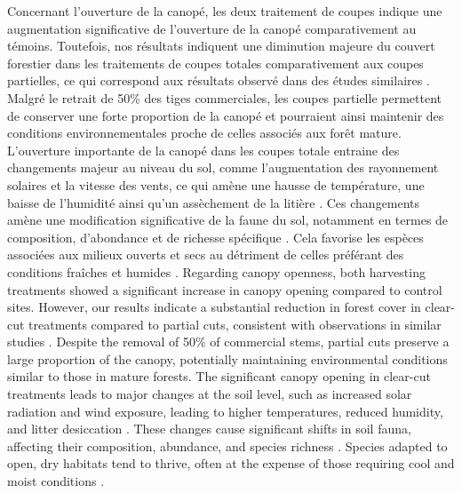
Concernant l'ouverture de la canopé, les deux traitement de coupes indique une augmentation significative de l'ouverture de la canopé comparativement au témoins. 
Toutefois, nos résultats indiquent une diminution majeure du couvert forestier dans les traitements de coupes totales comparativement aux coupes partielles, ce qui correspond aux résultats observé dans des études similaires \citep{Nolet2018Comparingeffects,Mazerolle2021Woodlandsalamander}. 
Malgré le retrait de 50\% des tiges commerciales, les coupes partielle permettent de conserver une forte proportion de la canopé et pourraient ainsi maintenir des conditions environnementales proche de celles associés aux forêt mature. 
L'ouverture importante de la canopé dans les coupes totale entraine des changements majeur au niveau du sol, comme l'augmentation des rayonnement solaires et la vitesse des vents, ce qui amène une hausse de température, une baisse de l'humidité ainsi qu'un assèchement de la litière \citep{Keenan1993ecologicaleffects,Chen1999MicroclimateForest,Lindo2003Microbialbiomass,Brooks2008Forestfloor}. 
Ces changements amène une modification significative de la faune du sol, notamment en termes de composition, d'abondance et de richesse spécifique \citep{Staab2023Insectdecline}. 
Cela favorise les espèces associées aux milieux ouverts et secs au détriment de celles préférant des conditions fraîches et humides \citep{Niemela2007effectsforestry,Ochs2022Responseterrestrial,Staab2023Insectdecline}.
Regarding canopy openness, both harvesting treatments showed a significant increase in canopy opening compared to control sites.  
However, our results indicate a substantial reduction in forest cover in clear-cut treatments compared to partial cuts, consistent with observations in similar studies \citep{Nolet2018Comparingeffects,Mazerolle2021Woodlandsalamander}.  
Despite the removal of 50\% of commercial stems, partial cuts preserve a large proportion of the canopy, potentially maintaining environmental conditions similar to those in mature forests.  
The significant canopy opening in clear-cut treatments leads to major changes at the soil level, such as increased solar radiation and wind exposure, leading to higher temperatures, reduced humidity, and litter desiccation \citep{Keenan1993ecologicaleffects,Chen1999MicroclimateForest,Lindo2003Microbialbiomass,Brooks2008Forestfloor}.  
These changes cause significant shifts in soil fauna, affecting their composition, abundance, and species richness \citep{Staab2023Insectdecline}.  
Species adapted to open, dry habitats tend to thrive, often at the expense of those requiring cool and moist conditions \citep{Niemela2007effectsforestry,Ochs2022Responseterrestrial,Staab2023Insectdecline}.

